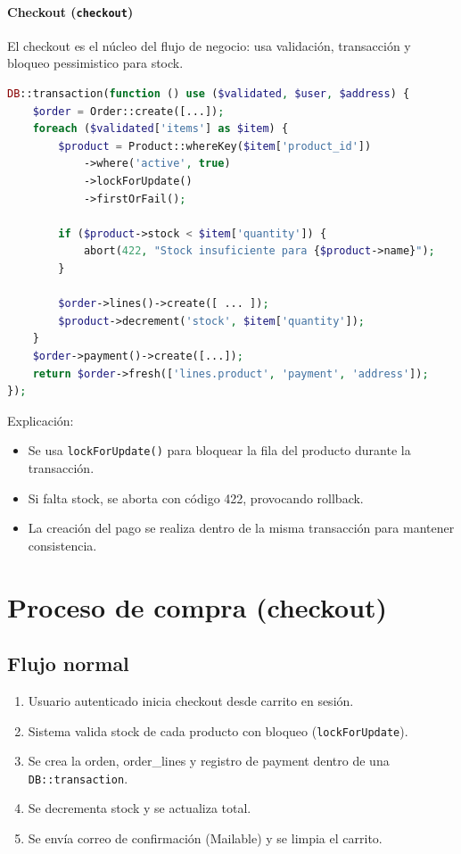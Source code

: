 \documentclass[12pt,a4paper]{report}
\begin{document}
\subsubsection{Checkout (\texttt{checkout})}
El checkout es el núcleo del flujo de negocio: usa validación, transacción y bloqueo pessimistico para stock.
\begin{lstlisting}[language=PHP]
DB::transaction(function () use ($validated, $user, $address) {
    $order = Order::create([...]);
    foreach ($validated['items'] as $item) {
        $product = Product::whereKey($item['product_id'])
            ->where('active', true)
            ->lockForUpdate()
            ->firstOrFail();

        if ($product->stock < $item['quantity']) {
            abort(422, "Stock insuficiente para {$product->name}");
        }

        $order->lines()->create([ ... ]);
        $product->decrement('stock', $item['quantity']);
    }
    $order->payment()->create([...]);
    return $order->fresh(['lines.product', 'payment', 'address']);
});
\end{lstlisting}

Explicación:
\begin{itemize}
  \item Se usa \texttt{lockForUpdate()} para bloquear la fila del producto durante la transacción.
  \item Si falta stock, se aborta con código 422, provocando rollback.
  \item La creación del pago se realiza dentro de la misma transacción para mantener consistencia.
\end{itemize}

\chapter{Proceso de compra (checkout)}

\section{Flujo normal}

\begin{enumerate}
  \item Usuario autenticado inicia checkout desde carrito en sesión.
  \item Sistema valida stock de cada producto con bloqueo (\texttt{lockForUpdate}).
  \item Se crea la orden, order\_lines y registro de payment dentro de una \texttt{DB::transaction}.
  \item Se decrementa stock y se actualiza total.
  \item Se envía correo de confirmación (Mailable) y se limpia el carrito.
\end{enumerate}
\end{document}
